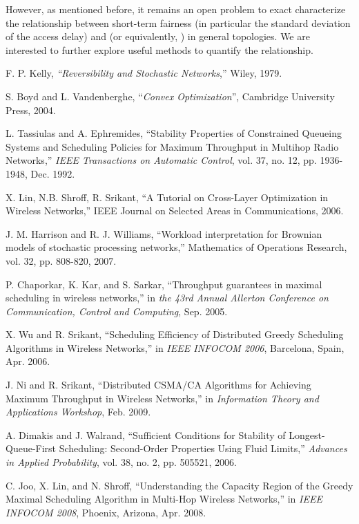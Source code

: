\documentclass{IEEEtran}
\begin{document}
However, as mentioned before, it remains an open problem to exact
characterize the relationship between short-term fairness (in particular
the standard deviation of the access delay) and  (or equivalently,
) in general topologies. We are interested to further explore
useful methods to quantify the relationship.
\begin{thebibliography}{32}
F. P. Kelly, \emph{{}``Reversibility and Stochastic
Networks},'' Wiley, 1979.

S. Boyd and L. Vandenberghe, {}``\emph{Convex
Optimization}'', Cambridge University Press, 2004.

L. Tassiulas and A. Ephremides, {}``Stability Properties
of Constrained Queueing Systems and Scheduling Policies for Maximum
Throughput in Multihop Radio Networks,'' \emph{IEEE Transactions
on Automatic Control}, vol. 37, no. 12, pp. 1936-1948, Dec. 1992.

X. Lin, N.B. Shroff, R. Srikant, {}``A Tutorial
on Cross-Layer Optimization in Wireless Networks,'' IEEE Journal
on Selected Areas in Communications, 2006.

J. M. Harrison and R. J. Williams, {}``Workload interpretation
for Brownian models of stochastic processing networks,'' Mathematics
of Operations Research, vol. 32, pp. 808-820, 2007.

P. Chaporkar, K. Kar, and S. Sarkar,
{}``Throughput guarantees in maximal scheduling in wireless networks,''
in \emph{the 43rd Annual Allerton Conference on Communication, Control
and Computing}, Sep. 2005.

X. Wu and R. Srikant, {}``Scheduling Efficiency
of Distributed Greedy Scheduling Algorithms in Wireless Networks,''
in\emph{ IEEE INFOCOM 2006}, Barcelona, Spain, Apr. 2006.

J. Ni and R. Srikant, \textquotedblleft{}Distributed
CSMA/CA Algorithms for Achieving Maximum Throughput in Wireless Networks,\textquotedblright{}
in\emph{ Information Theory and Applications Workshop}, Feb. 2009.

A. Dimakis and J. Walrand, {}``Sufficient Conditions
for Stability of Longest-Queue-First Scheduling: Second-Order Properties
Using Fluid Limits,'' \emph{Advances in Applied Probability}, vol.
38, no. 2, pp. 505\textendash{}521, 2006.

C. Joo, X. Lin, and N. Shroff, {}``Understanding the
Capacity Region of the Greedy Maximal Scheduling Algorithm in Multi-Hop
Wireless Networks,'' in \emph{IEEE INFOCOM 2008}, Phoenix, Arizona,
Apr. 2008.


\end{thebibliography}
\end{document}
